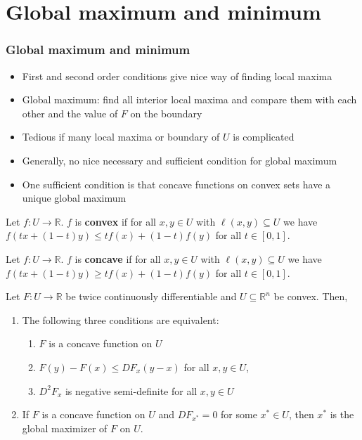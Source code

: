 \documentclass[compress]{beamer}
\def\R{\mathbb{R}}
\renewcommand{\to}{{\rightarrow}}
\begin{document}
\section{Global maximum and minimum}

\begin{frame}
  \frametitle{Global maximum and minimum}
  \begin{itemize}
  \item First and second order conditions give nice way of finding
    local maxima
  \item Global maximum: find all interior local maxima and compare
    them with each other and the value of $F$ on the boundary
  \item Tedious if many local maxima or boundary of $U$ is complicated 
  \item Generally, no nice necessary and sufficient condition for
    global maximum
  \item One sufficient condition is that concave functions on convex
    sets have a unique global maximum
  \end{itemize}
\end{frame}

\begin{frame}
  \begin{definition}
    Let $f:U \to \R$. $f$ is \textbf{convex} if for all $x,y \in U$ with
    $\ell(x,y) \subseteq U$ we have $f(tx + (1-t)y) \leq tf(x) + (1-t)
    f(y)$ for all $t \in [0,1]$.
  \end{definition}
  \begin{definition}
    Let $f:U \to \R$. $f$ is \textbf{concave} if for all $x,y \in U$ with
    $\ell(x,y) \subseteq U$ we have $f(tx + (1-t)y) \geq tf(x) + (1-t)
    f(y)$ for all $t \in [0,1]$.
  \end{definition}
\end{frame}

\begin{frame}
  \begin{theorem}
    Let $F: U \to \R$ be twice continuously differentiable and $U
    \subseteq \R^n$ be convex. Then,
    \begin{enumerate}
    \item The following three conditions are equivalent:
      \begin{enumerate}
      \item $F$ is a concave function on $U$
      \item $F(y) - F(x) \leq DF_x(y-x)$ for all $x,y \in U$,
      \item $D^2 F_x$ is negative semi-definite for all $x, y \in U$
      \end{enumerate}
    \item If $F$ is a concave function on $U$ and $DF_{x^*} = 0$ for
      some $x^* \in U$, then
      $x^*$ is the global maximizer of $F$ on $U$.
    \end{enumerate}
  \end{theorem}
\end{frame}
\end{document}
